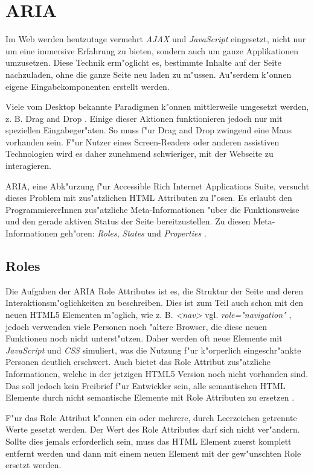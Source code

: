\documentclass[a4paper,bibtotoc,oneside]{scrbook}
\begin{document}
\chapter{ARIA}
Im Web werden heutzutage vermehrt \emph{AJAX} und \emph{JavaScript} eingesetzt, nicht nur um eine immersive Erfahrung zu bieten, sondern auch um ganze Applikationen umzusetzen. Diese Technik erm"oglicht es, bestimmte Inhalte auf der Seite nachzuladen, ohne die ganze Seite neu laden zu m"ussen. Au"serdem k"onnen eigene Eingabekomponenten erstellt werden. \cite[S.26]{mod_software}

Viele vom Desktop bekannte Paradigmen k"onnen mittlerweile umgesetzt werden, z. B. \glqq Drag and Drop \grqq. Einige dieser Aktionen funktionieren jedoch nur mit speziellen Eingabeger"aten. So muss f"ur Drag and Drop zwingend eine Maus vorhanden sein. F"ur Nutzer eines Screen-Readers oder anderen assistiven Technologien wird es daher zunehmend schwieriger, mit der Webseite zu interagieren. \cite{aria_intro}

ARIA, eine Abk"urzung f"ur Accessible Rich Internet Applications Suite, versucht dieses Problem mit zus"atzlichen HTML Attributen zu l"osen. Es erlaubt den ProgrammiererInnen zus"atzliche Meta-Informationen "uber die Funktionsweise und den gerade aktiven Status der Seite bereitzustellen. Zu diesen Meta-Informationen geh"oren: \emph{Roles}, \emph{States} und \emph{Properties} \cite{aria_intro}. 


\section{Roles}
Die Aufgaben der ARIA Role Attributes ist es, die Struktur der Seite und deren Interaktionsm"oglichkeiten zu beschreiben. Dies ist zum Teil auch schon mit den neuen HTML5 Elementen m"oglich, wie z. B. \emph{<nav>} \cite[Abschnitt 4.4.3]{html5} vgl. \emph{role="navigation"} \cite[Abschnitt 3.1]{xhtml_vocab}, jedoch verwenden viele Personen noch "altere Browser, die diese neuen Funktionen noch nicht unterst"utzen. Daher werden oft neue Elemente mit \emph{JavaScript} und \emph{CSS} simuliert, was die Nutzung f"ur k"orperlich eingeschr"ankte Personen deutlich erschwert. Auch bietet das Role Attribut zus"atzliche Informationen, welche in der jetzigen HTML5 Version noch nicht vorhanden sind\cite{html5}. Das soll jedoch kein Freibrief f"ur Entwickler sein, alle semantischen HTML Elemente durch nicht semantische Elemente mit Role Attributen zu ersetzen \cite[Abschnitt 3]{roles}. 

F"ur das Role Attribut k"onnen ein oder mehrere, durch Leerzeichen getrennte Werte gesetzt werden. Der Wert des Role Attributes darf sich nicht ver"andern. Sollte dies jemals erforderlich sein, muss das HTML Element zuerst komplett entfernt werden und dann mit einem neuen Element mit der gew"unschten Role ersetzt werden.\cite[Abschnitt 5]{aria_roles}
\end{document}
